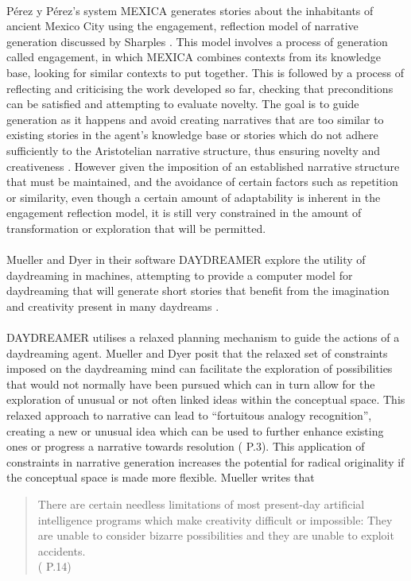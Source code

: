 \documentclass[letterpaper]{article}
\begin{document}
\\P\'erez y P\'erez's system MEXICA \cite{Perez2015} generates stories about the inhabitants of ancient Mexico City using the engagement, reflection model  of narrative generation discussed by Sharples \cite{Sharples96anaccount}. This model involves a process of generation called engagement, in which MEXICA combines contexts from its knowledge base, looking for similar contexts to put together. This is followed by a process of reflecting and criticising the work developed so far, checking that preconditions can be satisfied and attempting to evaluate novelty. The goal is to guide generation as it happens and avoid creating narratives that are too similar to existing stories in the agent's knowledge base or stories which do not adhere sufficiently to the Aristotelian narrative structure, thus ensuring novelty and creativeness \cite{Perez2015, PEREZYPEREZ200415}. However given the imposition of an established narrative structure that must be maintained, and the avoidance of certain factors such as repetition or similarity, even though a certain amount of adaptability is inherent in the engagement reflection model, it is still very constrained in the amount of transformation or exploration that will be permitted.\\
\\Mueller and Dyer in their software DAYDREAMER explore the utility of daydreaming in machines, attempting to provide a computer model for daydreaming that will generate short stories that benefit from the imagination and creativity present in many daydreams \cite{Mueller1985}.\\
\\DAYDREAMER utilises a relaxed planning mechanism to guide the actions of a daydreaming agent. Mueller and Dyer posit that the relaxed set of constraints imposed on the daydreaming mind can facilitate the exploration of possibilities that would not normally have been pursued which can in turn allow for the exploration of unusual or not often linked ideas within the conceptual space. This relaxed approach to narrative can lead to \enquote{fortuitous analogy recognition}, creating a new or unusual idea which can be used to further enhance existing ones or progress a narrative towards resolution (\citeauthor{Mueller1985}  \citeyear{Mueller1985} P.3). This application of constraints in narrative generation increases the potential for radical originality if the conceptual space is made more flexible. Mueller writes that
\begin{quote}
There are certain needless limitations of most present-day artificial intelligence programs which make creativity difficult or impossible: They are unable to consider bizarre possibilities and they are unable to exploit accidents.\\
(\citeauthor{Mueller:1990:DHM:77492} \citeyear{Mueller:1990:DHM:77492} P.14)
\end{quote}
\end{document}
